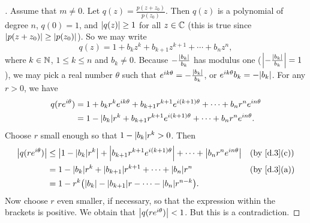 \begin{proof}[]
  Assume that \(m \neq 0\).
  Let \(q(z) = \frac{p(z + z_0)}{p(z_0)}\).
  Then \(q(z)\) is a polynomial of degree \(n\), \(q(0) = 1\), and \(\left\lvert q(z)\right\rvert \geq 1\) for all \(z \in \mathbb{C}\)
  (this is true since \(\left\lvert p(z + z_0)\right\rvert \geq \left\lvert p(z_0)\right\rvert\)).
  So we may write
  \[
    q(z) = 1 + b_k z^k + b_{k + 1} z^{k + 1} + \cdots + b_n z^n,
  \]
  where \(k \in \mathbb{N}\), \(1 \leq k \leq n\) and \(b_k \neq 0\).
  Because \(-\frac{\left\lvert b_k\right\rvert}{b_k}\) has modulus one (\(\left\lvert-\frac{\left\lvert b_k\right\rvert}{b_k}\right\rvert = 1\)), we may pick a real number \(\theta\) such that \(e^{i k \theta} = - \frac{\left\lvert b_k\right\rvert}{b_k}\), or \(e^{i k \theta} b_k = -\abs{b_k}\).
  For any \(r > 0\), we have
  \begin{align*}
    q(r e^{i \theta}) & = 1 + b_k r^k e^{i k \theta} + b_{k + 1} r^{k + 1} e^{i (k + 1) \theta} + \cdots + b_n r^n e^{i n \theta} \\
                      & = 1 - \abs{b_k} r^k + b_{k + 1} r^{k + 1} e^{i (k + 1) \theta} + \cdots + b_n r^n e^{i n \theta}.
  \end{align*}
  Choose \(r\) small enough so that \(1 - \abs{b_k} r^k > 0\).
  Then
  \begin{align*}
    \abs{q(r e^{i \theta})} & \leq \abs{1 - \abs{b_k} r^k} + \abs{b_{k + 1} r^{k + 1} e^{i (k + 1) \theta}} + \cdots + \abs{b_n r^n e^{i n \theta}} &  & \text{(by \cref{d.3}(c))} \\
                            & = 1 - \abs{b_k} r^k + \abs{b_{k + 1}} r^{k + 1} + \cdots + \abs{b_n} r^n                                              &  & \text{(by \cref{d.3}(a))} \\
                            & = 1 - r^k \pa{\abs{b_k} - \abs{b_{k + 1}} r - \cdots - \abs{b_n} r^{n - k}}.
  \end{align*}
  Now choose \(r\) even smaller, if necessary, so that the expression within the brackets is positive.
  We obtain that \(\left\lvert q(r e^{i \theta})\right\rvert < 1\).
  But this is a contradiction.
\end{proof}
